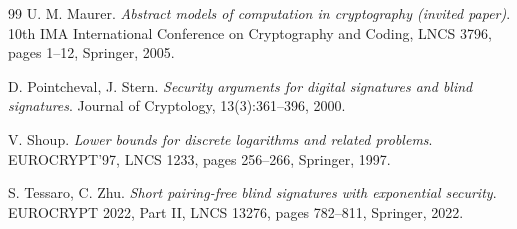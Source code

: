 \documentclass{aicr-conjecture}
\begin{document}
\begin{aicrbibliography}{99}
U. M. Maurer.
\emph{Abstract models of computation in cryptography (invited paper)}.
10th IMA International Conference on Cryptography and Coding, LNCS 3796,
pages 1--12, Springer, 2005.

D. Pointcheval, J. Stern.
\emph{Security arguments for digital signatures and blind signatures}.
Journal of Cryptology, 13(3):361--396, 2000.

V. Shoup.
\emph{Lower bounds for discrete logarithms and related problems}.
EUROCRYPT'97, LNCS 1233, pages 256--266, Springer, 1997.

S. Tessaro, C. Zhu.
\emph{Short pairing-free blind signatures with exponential security}.
EUROCRYPT 2022, Part II, LNCS 13276, pages 782--811, Springer, 2022.

\end{aicrbibliography}
\end{document}
